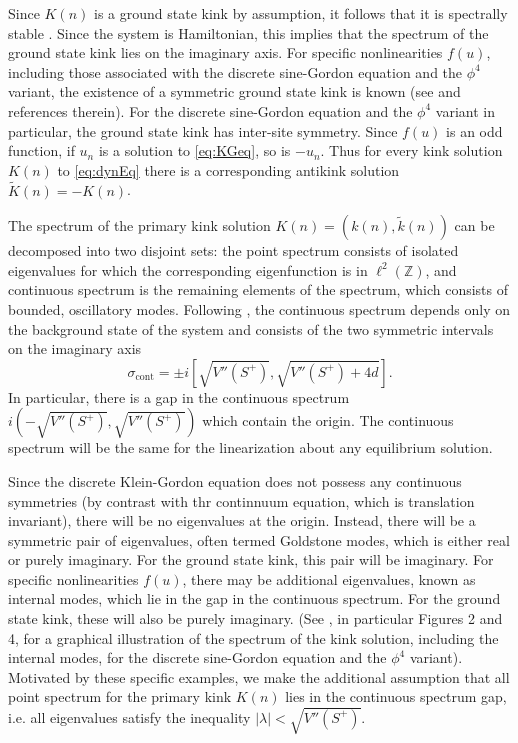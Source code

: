 \documentclass[12pt]{article}
\def\Z{{\mathbb Z}}
\begin{document}
Since $K(n)$ is a ground state kink by assumption, it follows that it is spectrally stable \cite{KevrekidisWeinstein2000}. Since the system is Hamiltonian, this implies that the spectrum of the ground state kink lies on the imaginary axis. For specific nonlinearities $f(u)$, including those associated with the discrete sine-Gordon equation and the $\phi^4$ variant, the existence of a symmetric ground state kink is known (see \cite{KevrekidisWeinstein2000} and references therein). For the discrete sine-Gordon equation and the $\phi^4$ variant in particular, the ground state kink has inter-site symmetry. Since $f(u)$ is an odd function, if $u_n$ is a solution to \cref{eq:KGeq}, so is $-u_n$. Thus for every kink solution $K(n)$ to \cref{eq:dynEq} there is a corresponding antikink solution $\tilde{K}(n) = -K(n)$.

The spectrum of the primary kink solution $K(n) = (k(n),\tilde{k}(n))$ can be decomposed into two disjoint sets: the point spectrum consists of isolated eigenvalues for which the corresponding eigenfunction is in $\ell^2(\Z)$, and continuous spectrum is the remaining elements of the spectrum, which consists of bounded, oscillatory modes. Following \cite{KevrekidisWeinstein2000}, the continuous spectrum depends only on the background state of the system and consists of the two symmetric intervals on the imaginary axis
\begin{equation}\label{eq:contspec}
	\sigma_{\text{cont}} = \pm i \left[\sqrt{V''(S^+)}, \sqrt{V''(S^+) + 4d}\right].
\end{equation}
In particular, there is a gap in the continuous spectrum $i\left(-\sqrt{V''(S^+)},\sqrt{V''(S^+)}\right)$ which contain the origin. The continuous spectrum will be the same for the linearization about any equilibrium solution. 

Since the discrete Klein-Gordon equation does not possess any continuous symmetries (by contrast with thr continnuum equation, which is translation invariant), there will be no eigenvalues at the origin. Instead, there will be a symmetric pair of eigenvalues, often termed Goldstone modes, which is either real or purely imaginary. For the ground state kink, this pair will be imaginary. For specific nonlinearities $f(u)$, there may be additional eigenvalues, known as internal modes, which lie in the gap in the continuous spectrum. For the ground state kink, these will also be purely imaginary. (See \cite{KevrekidisWeinstein2000}, in particular Figures 2 and 4, for a graphical illustration of the spectrum of the kink solution, including the internal modes, for the discrete sine-Gordon equation and the $\phi^4$ variant). Motivated by these specific examples, we make the additional assumption that all point spectrum for the primary kink $K(n)$ lies in the continuous spectrum gap, i.e. all eigenvalues satisfy the inequality $|\lambda| < \sqrt{V''(S^+)}$. 
\end{document}
